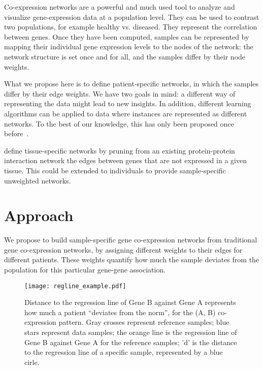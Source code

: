 \documentclass{bioinfo}
\begin{document}
Co-expression networks are a powerful and much used tool to analyze and visualize gene-expression data at a population level. 
They can be used to contrast two populations, for example healthy vs. diseased. 
They represent the correlation between genes.
Once they have been computed, samples can be represented by mapping their individual gene expression levels to the nodes of the network: the network structure is set once and for all, and the samples differ by their node weights.


What we propose here is to define patient-specific networks, in which the samples differ by their edge weights. We have two goals in mind: a different way of representing the data might lead to new insights. In addition, different learning algorithms can be applied to data where instances are represented as different networks. To the best of our knowledge, this has only been proposed once before~\citep{kuijjer2015}.

\cite{bossi2009} define tissue-specific networks by pruning from an existing protein-protein interaction network the edges between genes that are not expressed in a given tissue. This could be extended to individuals to provide sample-specific unweighted networks. 






\section{Approach}

We propose to build sample-specific gene co-expression networks from traditional gene co-expression networks, by assigning different weights to their edges for different patients. These weights quantify how much the sample deviates from the population for this particular gene-gene association. 

\begin{figure}[!tpb]
  \centerline{\texttt{[image: regline\_example.pdf]}}
  \caption{Distance to the regression line of Gene B against Gene A represents how much a patient ``deviates from the norm'', for the (A, B) co-expression pattern. Gray crosses represent reference samples; blue stars represent data samples; the orange line is the regression line of Gene B against Gene A for the reference samples; 'd' is the distance to the regression line of a specific sample, represented by a blue cirle.}
  \label{fig:distance_to_regline}
\end{figure}
\end{document}
